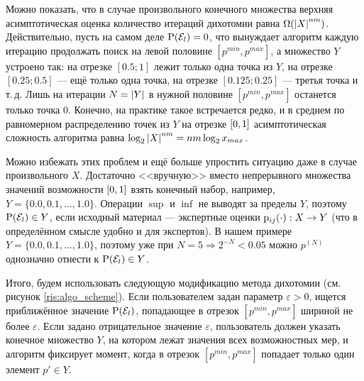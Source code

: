 Можно показать, что в случае произвольного конечного множества верхняя асимптотическая оценка количество итераций дихотомии равна $\Omega(\left| X \right|^{nm})$. Действительно, пусть на самом деле ${\mathrm{P}}(\mathcal{E}_l) = 0$, что вынуждает алгоритм каждую итерацию продолжать поиск на левой половине $[p^{min}, p^{max}]$, а множество $Y$ устроено так: на отрезке $[0.5;  1]$ лежит только одна точка из $Y$, на отрезке $[0.25;  0.5]$ --- ещё только одна точка, на отрезке $[0.125;  0.25]$ --- третья точка и т.\,д. Лишь на итерации $N = \left| Y \right|$ в нужной половине $[p^{min}, p^{max}]$ останется только точка $0$. Конечно, на практике такое встречается редко, и в среднем по равномерном распределению точек из $Y$ на отрезке $[0,1]$ асимптотическая сложность алгоритма  равна $\log_{2}{\left| X \right|^{nm}} =  nm \log_{2}{x_{max}}$. 

Можно избежать этих проблем и ещё больше упростить ситуацию даже в случае произвольного $X$. Достаточно <<вручную>> вместо непрерывного множества значений возможности $[0,1]$ взять конечный набор, например, $Y = \{0.0, 0.1, \ldots, 1.0\}$. Операции $\sup$ и $\inf$ не выводят за пределы $Y$, поэтому ${\mathrm{P}}(\mathcal{E}_l) \in Y$, если исходный материал --- экспертные оценки ${\mathrm{p}}_{ij}(\cdot): X \rightarrow Y$ (что в определённом смысле удобно и для экспертов). В нашем примере $Y = \{0.0, 0.1, \ldots, 1.0\}$, поэтому уже при $N = 5 \Rightarrow 2^{-N} < 0.05$ можно $p^{(N)}$ однозначно отнести к ${\mathrm{P}}(\mathcal{E}_l) \in Y$.

Итого, будем использовать следующую модификацию метода дихотомии (см. рисунок \ref{ris:algo_scheme}). Если пользователем задан параметр $\varepsilon > 0$, ищется приближённое значение ${\mathrm{P}}(\mathcal{E}_l)$, попадающее в отрезок $[p^{min}, p^{max}]$ шириной не более $\varepsilon$. Если задано отрицательное значение $\varepsilon$, пользователь должен указать конечное множество $Y$, на котором лежат значения всех возможностных мер, и алгоритм фиксирует момент, когда в отрезок $[p^{min}, p^{max}]$ попадает только один элемент $p' \in Y$. %

